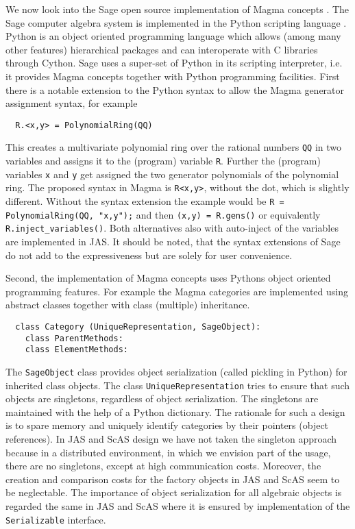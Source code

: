 \documentclass{llncs}
\newcommand{\code}[1]{\texttt{#1}}
\begin{document}
We now look into the Sage open source implementation of Magma concepts
\cite{Stein:2005,SageWiki:2009}.  The Sage computer algebra system is
implemented in the Python scripting language \cite{vanRossum:1991}.
Python is an object oriented programming language which allows (among
many other features) hierarchical packages and can interoperate with C
libraries through Cython. Sage uses a super-set of Python in its
scripting interpreter, i.e. it provides Magma concepts together with
Python programming facilities. First there is a notable extension to
the Python syntax to allow the Magma generator assignment syntax, for
example
\begin{verbatim}
  R.<x,y> = PolynomialRing(QQ)
\end{verbatim}
This creates a multivariate polynomial ring over the rational numbers
\code{QQ} in two variables and assigns it to the (program) variable
\code{R}. Further the (program) variables \code{x} and \code{y} get
assigned the two generator polynomials of the polynomial ring. The
proposed syntax in Magma is \code{R<x,y>}, without the dot, which is
slightly different.  Without the syntax extension the example
would be \code{R = Poly\-nomial\-Ring(QQ, "x,y");} and then \code{(x,y) = R.\-gens()}
or equivalently \code{R.in\-ject\-\_variables()}.
Both alternatives also with auto-inject of the variables are implemented in JAS.
It should be noted, that the syntax extensions of Sage do not add to
the expressiveness but are solely for user convenience.

Second, the implementation of Magma concepts uses Pythons object oriented
programming features. For example the Magma categories are implemented
using abstract classes together with class (multiple) inheritance.
\begin{verbatim}
  class Category (UniqueRepresentation, SageObject):
    class ParentMethods:
    class ElementMethods:
\end{verbatim}
The \code{SageObject} class provides object serialization (called
pickling in Python) for inherited class objects. The class
\code{UniqueRepresentation} tries to ensure that such objects are
singletons, regardless of object serialization. The singletons are
maintained with the help of a Python dictionary.  The rationale for
such a design is to spare memory and uniquely identify categories by
their pointers (object references). 
%
In JAS and ScAS design we have not taken the singleton approach
because in a distributed environment, in which we envision part of the
usage, there are no singletons, except at high communication costs.
Moreover, the creation and comparison costs for the factory objects in
JAS and ScAS seem to be neglectable. The importance of object
serialization for all algebraic objects is regarded the same in JAS and
ScAS where it is ensured by implementation of the \code{Serializable}
interface.
\end{document}
